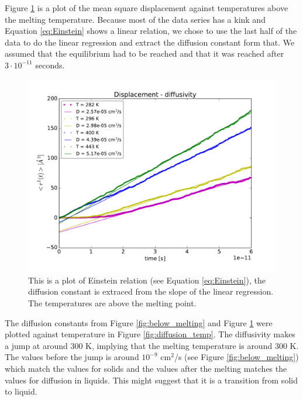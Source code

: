 Figure \ref{fig:above_melting} is a plot of the mean square displacement against temperatures above the melting temperature. Because most of the data series has a kink and Equation \ref{eq:Einstein} shows a linear relation, we chose to use the last half of the data to do the linear regression and extract the diffusion constant form that. We assumed that the equilibrium had to be reached and that it was reached after $3\cdot 10^{-11}$ seconds.

\begin{figure}[H]
\center
\includegraphics[width=0.8\linewidth]{../figures/above_melting}\caption{This is a plot of Einstein relation (see Equation \ref{eq:Einstein}), the diffusion constant is extraced from the slope of the linear regression. The temperatures are above the melting point.}\label{fig:above_melting}
\end{figure}


The diffusion constants from Figure \ref{fig:below_melting} and Figure \ref{fig:above_melting} were plotted against temperature in Figure \ref{fig:diffusion_temp}. The diffusivity makes a jump at around 300 K, implying that the melting temperature is around 300 K. The values before the jump is around $10^{-9}$ cm$^2$/s (see Figure \ref{fig:below_melting}) which match the values for solids and the values after the melting matches the values for diffusion in liquids. This might suggest that it is a transition from solid to liquid.

